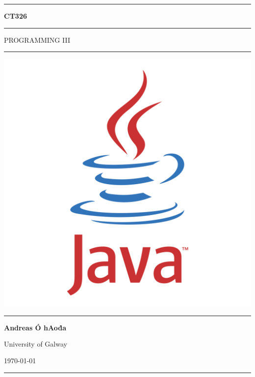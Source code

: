 \documentclass[a4paper,11pt]{article}
\begin{document}
\begin{titlepage}
    \begin{center}
        \hrule
        \vspace*{0.6cm}
        \huge \textbf{CT326}
        \vspace*{0.6cm}
        \hrule
        \LARGE
       \vspace{0.5cm}
        PROGRAMMING III
       \vspace{0.5cm}
       \hrule
            
       \vfill
       \includegraphics[width=\textwidth]{images/java-logo.png}
        \vfill

        \Large
       \vspace{0.5cm}
       \hrule
       \vspace{0.5cm}
       \textbf{Andreas Ó hAoḋa}
            
       \normalsize
       University of Galway

       \today

       \vspace{0.5cm}
       \hrule
    \end{center}
\end{titlepage}
\end{document}

